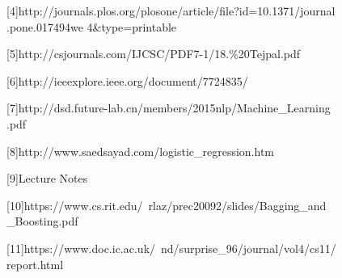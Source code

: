 \documentclass[conference]{IEEEtran}
\begin{document}
[4]http://journals.plos.org/plosone/article/file?id=10.1371/journal\\.pone.017494we 4\&type=printable 

[5]http://csjournals.com/IJCSC/PDF7-1/18.\%20Tejpal.pdf

[6]http://ieeexplore.ieee.org/document/7724835/

[7]http://dsd.future-lab.cn/members/2015nlp/Machine\_Learning\\.pdf

[8]http://www.saedsayad.com/logistic\_regression.htm

[9]Lecture Notes

[10]https://www.cs.rit.edu/~rlaz/prec20092/slides/Bagging\_and\\\_Boosting.pdf

[11]https://www.doc.ic.ac.uk/~nd/surprise\_96/journal/vol4/cs11/\\report.html



%
%
%
%
%







\end{document}
